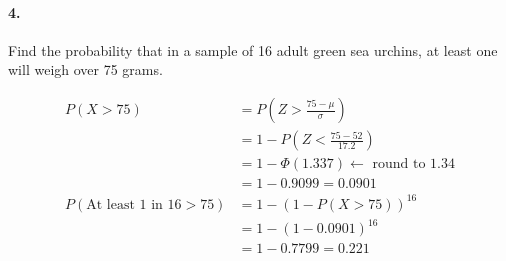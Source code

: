     \paragraph*{4.}
    Find the probability that in a sample of 16 adult green sea urchins, at least one will weigh over 75 grams.
    \\
    \begin{mdframed}
        \begin{align*}
            P(X > 75)   & = P(Z > \frac{75-\mu}{\sigma})                        \\
                        & = 1 - P(Z < \frac{75-52}{17.2})                       \\
                        & = 1 - \Phi(1.337) \leftarrow \text{ round to 1.34}    \\
                        & = 1 - 0.9099 = 0.0901                                 \\
            P(\text{At least 1 in 16} > 75)
                        & = 1 - (1-P(X > 75))^{16}                              \\
                        & = 1 - (1-0.0901)^{16}                                 \\
                        & = 1 - 0.7799 = \boxed{0.221}
        \end{align*}
    \end{mdframed}
    
